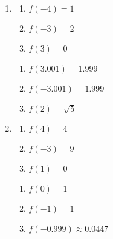 \begin{enumerate}
\setcounter{enumi}{\value{HW}}

\item 

\begin{multicols}{3}
\begin{enumerate}

\item $f(-4) = 1$
\item  $f(-3) = 2$
\item  $f(3) = 0$

\setcounter{HWindent}{\value{enumii}}
\end{enumerate}
\end{multicols}

\begin{multicols}{3}
\begin{enumerate}
\setcounter{enumii}{\value{HWindent}}

\item  $f(3.001) = 1.999$
\item  $f(-3.001) = 1.999$
\item  $f(2) = \sqrt{5}$

\setcounter{HWindent}{\value{enumii}}
\end{enumerate}
\end{multicols}


\item

\begin{multicols}{3}
\begin{enumerate}


\item $f(4) = 4$
\item $f(-3) = 9$
\item $f(1) = 0$


\setcounter{HWindent}{\value{enumii}}
\end{enumerate}
\end{multicols}

\begin{multicols}{3}
\begin{enumerate}
\setcounter{enumii}{\value{HWindent}}

\item $f(0) = 1$
\item $f(-1) = 1$
\item \small $f(-0.999) \approx 0.0447$ \normalsize

\setcounter{HWindent}{\value{enumii}}
\end{enumerate}
\end{multicols}

\setcounter{HW}{\value{enumi}}
\end{enumerate}


